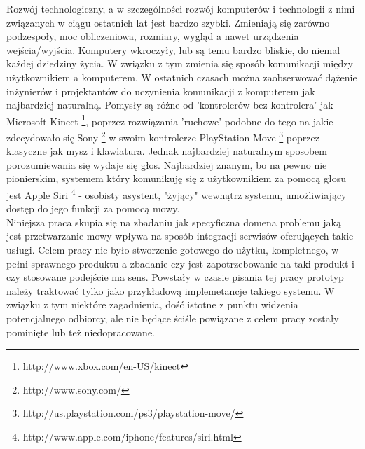 

\begin{abstracts}        %

Rozwój technologiczny, a w szczególności rozwój komputerów i technologii z nimi związanych w ciągu ostatnich lat jest bardzo szybki. Zmieniają się zarówno podzespoły, moc obliczeniowa, rozmiary, wygląd a nawet urządzenia wejścia/wyjścia. Komputery wkroczyły, lub są temu bardzo bliskie, do niemal każdej dziedziny życia. W związku z tym zmienia się sposób komunikacji między użytkownikiem a komputerem. W ostatnich czasach można zaobserwować dążenie inżynierów i projektantów do uczynienia komunikacji z komputerem jak najbardziej naturalną. Pomysły są różne od 'kontrolerów bez kontrolera' jak Microsoft Kinect \footnote {http://www.xbox.com/en-US/kinect}, poprzez rozwiązania 'ruchowe' podobne do tego na jakie zdecydowało się Sony \footnote{http://www.sony.com/} w swoim kontrolerze PlayStation Move \footnote{http://us.playstation.com/ps3/playstation-move/} poprzez klasyczne  jak mysz i klawiatura. Jednak najbardziej naturalnym sposobem porozumiewania się wydaje się głos. Najbardziej znanym, bo na pewno nie pionierskim, systemem który komunikuję się z użytkownikiem za pomocą głosu jest Apple Siri \footnote{http://www.apple.com/iphone/features/siri.html} - osobisty asystent, "żyjący" wewnątrz systemu, umożliwiający dostęp do jego funkcji za pomocą mowy.\\
Niniejsza praca skupia się na zbadaniu jak specyficzna domena problemu jaką jest przetwarzanie mowy wpływa na sposób integracji serwisów oferujących takie usługi. Celem pracy nie było stworzenie gotowego do użytku, kompletnego, w pełni sprawnego produktu a zbadanie czy jest zapotrzebowanie na taki produkt i czy stosowane podejście ma sens. Powstały w czasie pisania tej pracy prototyp należy traktować tylko jako przykładową implemetancje takiego systemu. W związku z tym niektóre zagadnienia, dość istotne z punktu widzenia potencjalnego odbiorcy, ale nie będące ściśle powiązane z celem pracy zostały pominięte lub też niedopracowane. 
\end{abstracts}


